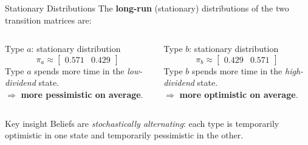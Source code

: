 \documentclass[aspectratio=169]{beamer}
\begin{document}
\begin{frame}{Stationary Distributions}
  The \textbf{long-run} (stationary) distributions of the two transition
  matrices are:

  \bigskip
  \begin{columns}
    \begin{block}{Type $a$: stationary distribution}
      \[
        \pi_a \approx \begin{bmatrix} 0.571 & 0.429 \end{bmatrix}
      \]
      Type $a$ spends more time in the \emph{low-dividend} state.\\[4pt]
      $\Rightarrow$ \textbf{more pessimistic on average}.
    \end{block}

    \begin{block}{Type $b$: stationary distribution}
      \[
        \pi_b \approx \begin{bmatrix} 0.429 & 0.571 \end{bmatrix}
      \]
      Type $b$ spends more time in the \emph{high-dividend} state.\\[4pt]
      $\Rightarrow$ \textbf{more optimistic on average}.
    \end{block}
  \end{columns}

  \bigskip
  \begin{alertblock}{Key insight}
    Beliefs are \emph{stochastically alternating}: each type is temporarily
    optimistic in one state and temporarily pessimistic in the other.
  \end{alertblock}
\end{frame}
\end{document}
